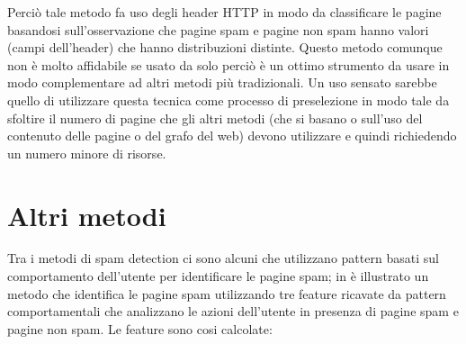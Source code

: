 Perciò tale metodo fa uso degli header HTTP in modo da classificare le pagine basandosi sull'osservazione che pagine spam e pagine non spam hanno valori (campi dell'header) che hanno distribuzioni distinte. Questo metodo comunque non è molto affidabile se usato da solo perciò è un ottimo strumento da usare in modo complementare ad altri metodi più tradizionali. Un uso sensato sarebbe quello di utilizzare questa tecnica come processo di preselezione in modo tale da sfoltire il numero di pagine che gli altri metodi (che si basano o sull'uso del contenuto delle pagine o del grafo del web) devono utilizzare e quindi richiedendo un numero minore di risorse.

\section{Altri metodi}
 Tra i metodi di spam detection ci sono alcuni che utilizzano pattern basati sul comportamento dell'utente per identificare le pagine spam; in \cite{Liu:2008:UBO:1367497.1367645} è illustrato un metodo che identifica le pagine spam utilizzando tre feature ricavate da pattern comportamentali che analizzano le azioni dell'utente in presenza di pagine spam e pagine non spam. Le feature sono cosi calcolate:
